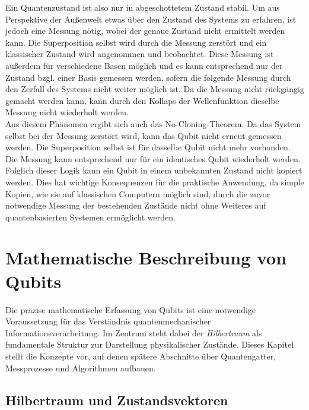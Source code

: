 Ein Quantenzustand ist also nur in abgeschottetem Zustand stabil. Um aus Perspektive der Außenwelt etwas über den Zustand des Systems zu erfahren, ist jedoch eine Messung nötig, wobei der genaue Zustand nicht ermittelt werden kann.
Die Superposition selbst wird durch die Messung zerstört und ein klassischer Zustand wird angenommen und beobachtet. Diese Messung ist außerdem für verschiedene Basen möglich und es kann entsprechend nur der Zustand bzgl. einer Basis gemessen werden, sofern die folgende Messung durch den Zerfall des Systems nicht weiter möglich ist.
Da die Messung nicht rückgängig gemacht werden kann, kann durch den Kollaps der Wellenfunktion dieselbe Messung nicht wiederholt werden.
\cite{homeister_quantum_2022}
\\

Aus diesem Phänomen ergibt sich auch das No-Cloning-Theorem. Da das System selbst bei der Messung zerstört wird, kann das Qubit nicht erneut gemessen werden. Die Superposition selbst ist für dasselbe Qubit nicht mehr vorhanden. Die Messung kann entsprechend nur für ein identisches Qubit wiederholt werden.
Folglich dieser Logik kann ein Qubit in einem unbekannten Zustand nicht kopiert werden. Dies hat wichtige Konsequenzen für die praktische Anwendung, da simple Kopien, wie sie auf klassischen Computern möglich sind, durch die zuvor notwendige Messung der bestehenden Zustände nicht ohne Weiteres auf quantenbasierten Systemen ermöglicht werden.
\cite{hughes_quantum_2021}


\section{Mathematische Beschreibung von Qubits}
\label{sec:hilbertraum}

Die präzise mathematische Erfassung von Qubits ist eine notwendige Voraussetzung für das Verständnis quantenmechanischer Informationsverarbeitung. Im Zentrum steht dabei der \textit{Hilbertraum} als fundamentale Struktur zur Darstellung physikalischer Zustände. Dieses Kapitel stellt die Konzepte vor, auf denen spätere Abschnitte über Quantengatter, Messprozesse und Algorithmen aufbauen. 

\subsection{Hilbertraum und Zustandsvektoren}

